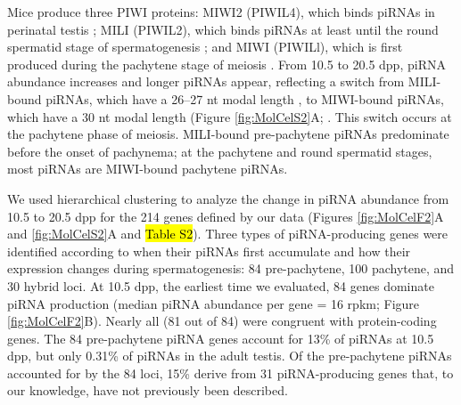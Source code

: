     Mice produce three PIWI proteins: MIWI2 (PIWIL4), which binds piRNAs in perinatal testis \citep{Carmell2007, Aravin2008a}; MILI (PIWIL2), which binds piRNAs at least until the round spermatid stage of spermatogenesis \citep{Kuramochi-Miyagawa2004, Aravin2006, Aravin2007a}; and MIWI (PIWILl), which is first produced during the pachytene stage of meiosis \citep{Deng2002c}. From 10.5 to 20.5 dpp, piRNA abundance increases and longer piRNAs appear, reflecting a switch from MILI-bound piRNAs, which have a 26–27 nt modal length \citep{Montgomery1998, Aravin2006, Aravin2008a, Robine2009}, to MIWI-bound piRNAs, which have a 30 nt modal length (Figure \ref{fig:MolCelS2}A; \citep{Reuter2009, Robine2009}. This switch occurs at the pachytene phase of meiosis. MILI-bound pre-pachytene piRNAs predominate before the onset of pachynema; at the pachytene and round spermatid stages, most piRNAs are MIWI-bound pachytene piRNAs.

    We used hierarchical clustering to analyze the change in piRNA abundance from 10.5 to 20.5 dpp for the 214 genes defined by our data (Figures \ref{fig:MolCelF2}A and \ref{fig:MolCelS2}A and \hl{Table S2}). Three types of piRNA-producing genes were identified according to when their piRNAs first accumulate and how their expression changes during spermatogenesis: 84 pre-pachytene, 100 pachytene, and 30 hybrid loci. At 10.5 dpp, the earliest time we evaluated, 84 genes dominate piRNA production (median piRNA abundance per gene = 16 rpkm; Figure \ref{fig:MolCelF2}B). Nearly all (81 out of 84) were congruent with protein-coding genes. The 84 pre-pachytene piRNA genes account for 13\% of piRNAs at 10.5 dpp, but only 0.31\% of piRNAs in the adult testis. Of the pre-pachytene piRNAs accounted for by the 84 loci, 15\% derive from 31 piRNA-producing genes that, to our knowledge, have not previously been described.

